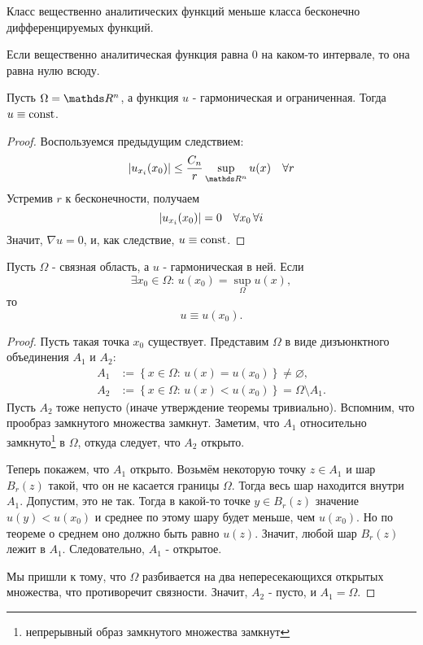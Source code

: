 \begin{note}
Класс вещественно аналитических функций меньше класса бесконечно дифференцируемых функций.
\end{note}

\begin{note}
Если вещественно аналитическая функция равна 0 на каком-то интервале, то она равна нулю всюду.
\end{note}

\begin{corollary}
Пусть $\Omega = \real^n$, а функция $u$ - гармоническая и ограниченная. Тогда $u \equiv \operatorname{const}$.
\end{corollary}
\begin{proof}
Воспользуемся предыдущим следствием:
$$ \abs{u_{x_i} (x_0)} \leq \frac {C_n} {r} \sup_{\real^n} u(x) \quad \forall r$$
Устремив $r$ к бесконечности, получаем
$$ \lvert u_{x_i} (x_0)\rvert = 0 \quad \forall x_0 \, \forall i$$
Значит, $\nabla u = 0$, и, как следствие, $u \equiv \operatorname{const}$.

\end{proof}

\begin{theorem}
Пусть $\Omega$ - связная область, а $u$ - гармоническая в ней. Если
$$ \exists x_0 \in \Omega: \, u(x_0) = \sup_\Omega u(x),$$
 то $$u \equiv u(x_0).$$
\end{theorem}
\begin{proof}
Пусть такая точка $x_0$ существует. Представим $\Omega$ в виде дизъюнктного объединения $A_1$ и $A_2$:
\begin{align*}
	A_1 &:= \left\{ x \in \Omega: \, u(x) = u(x_0) \right\} \neq \varnothing, \\
	A_2 &:= \left\{ x \in \Omega: \, u(x) < u(x_0) \right\} = \Omega \setminus A_1.
\end{align*}
Пусть $A_2$ тоже непусто (иначе утверждение теоремы тривиально). Вспомним, что прообраз замкнутого множества замкнут. Заметим, что $A_1$ относительно замкнуто\footnote{ непрерывный образ замкнутого множества замкнут} в $\Omega$, откуда следует, что $A_2$ открыто.

Теперь покажем, что $A_1$ открыто. Возьмём некоторую точку $z \in A_1$ и шар $B_r (z)$ такой, что он не касается границы $\Omega$. Тогда весь шар находится внутри $A_1$. Допустим, это не так. Тогда в какой-то точке $y \in B_r (z) $ значение $u(y) < u(x_0)$ и среднее по этому шару будет меньше, чем $u(x_0)$. Но по теореме о среднем оно должно быть равно $u(z)$. Значит, любой шар $B_r (z)$ лежит в $A_1$. Следовательно, $A_1$ - открытое.

Мы пришли к тому, что $\Omega$ разбивается на два непересекающихся открытых множества, что противоречит связности. Значит, $A_2$ - пусто, и $A_1 = \Omega$.

\end{proof}

